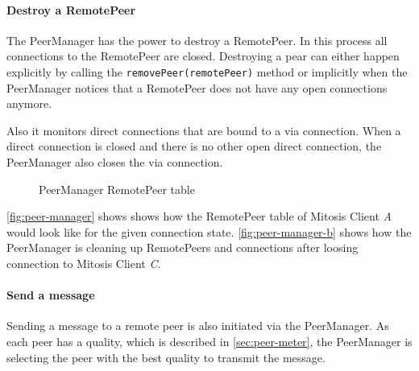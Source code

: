 \paragraph{Destroy a RemotePeer}
The PeerManager has the power to destroy a RemotePeer. In this process all connections to the RemotePeer are closed. 
Destroying a pear can either happen explicitly by calling the \lstinline|removePeer(remotePeer)| method or implicitly when the PeerManager notices that a RemotePeer does not have any open connections anymore.

Also it monitors direct connections that are bound to a via connection. When a direct connection is closed and there is no other open direct connection, the PeerManager also closes the via connection.

\begin{figure}
  \centering
    \hspace{1 cm}
	\caption{PeerManager RemotePeer table}
\label{fig:peer-manager}
\end{figure}

\vref{fig:peer-manager} shows shows how the RemotePeer table of Mitosis Client \textit{A} would look like for the given connection state. \vref{fig:peer-manager-b} shows how the PeerManager is cleaning up RemotePeers and connections after loosing connection to Mitosis Client \textit{C}. 

\paragraph{Send a message}
Sending a message to a remote peer is also initiated via the PeerManager. As each peer has a quality, which is described in \vref{sec:peer-meter}, the PeerManager is selecting the peer with the best quality to transmit the message.